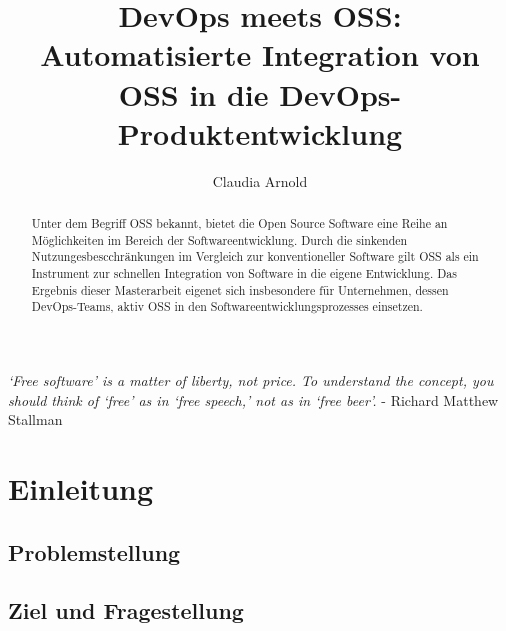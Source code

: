 \documentclass[12pt,titlepage]{article}
\begin{document}
\title{DevOps meets OSS: Automatisierte Integration von OSS in die DevOps-Produktentwicklung\\}
\author{Claudia Arnold}

\maketitle

\begin{abstract}
   Unter dem Begriff OSS bekannt, bietet die Open Source Software eine Reihe an Möglichkeiten im Bereich der Softwareentwicklung. Durch die sinkenden Nutzungesbescchränkungen im Vergleich zur konventioneller Software gilt OSS als ein Instrument zur schnellen Integration von Software in die eigene Entwicklung.
   Das Ergebnis dieser Masterarbeit eigenet sich insbesondere für Unternehmen, dessen DevOps-Teams, aktiv OSS in den Softwareentwicklungsprozesses einsetzen.  
\end{abstract}

\newpage  
\begin{center} 
    \vspace*{\fill}
    \textit{‘Free software’ is a matter of liberty, not price. To understand the concept, you should think of ‘free’ as in ‘free speech,’ not as in ‘free beer’.}
    \newline
    \newline - Richard Matthew Stallman
    \vspace*{\fill}
\end{center}

\newpage 
\tableofcontents
{}

\newpage
\section{Einleitung}


\subsection{Problemstellung}


\subsection{Ziel und Fragestellung}

\end{document}
